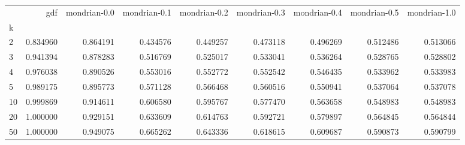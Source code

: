 \begin{tabular}{lrrrrrrrr}
\toprule
{} &       gdf &  mondrian-0.0 &  mondrian-0.1 &  mondrian-0.2 &  mondrian-0.3 &  mondrian-0.4 &  mondrian-0.5 &  mondrian-1.0 \\
k  &           &               &               &               &               &               &               &               \\
\midrule
2  &  0.834960 &      0.864191 &      0.434576 &      0.449257 &      0.473118 &      0.496269 &      0.512486 &      0.513066 \\
3  &  0.941394 &      0.878283 &      0.516769 &      0.525017 &      0.533041 &      0.536264 &      0.528765 &      0.528802 \\
4  &  0.976038 &      0.890526 &      0.553016 &      0.552772 &      0.552542 &      0.546435 &      0.533962 &      0.533983 \\
5  &  0.989175 &      0.895773 &      0.571128 &      0.566468 &      0.560516 &      0.550941 &      0.537064 &      0.537078 \\
10 &  0.999869 &      0.914611 &      0.606580 &      0.595767 &      0.577470 &      0.563658 &      0.548983 &      0.548983 \\
20 &  1.000000 &      0.929151 &      0.633609 &      0.614763 &      0.592721 &      0.579897 &      0.564845 &      0.564844 \\
50 &  1.000000 &      0.949075 &      0.665262 &      0.643336 &      0.618615 &      0.609687 &      0.590873 &      0.590799 \\
\bottomrule
\end{tabular}
